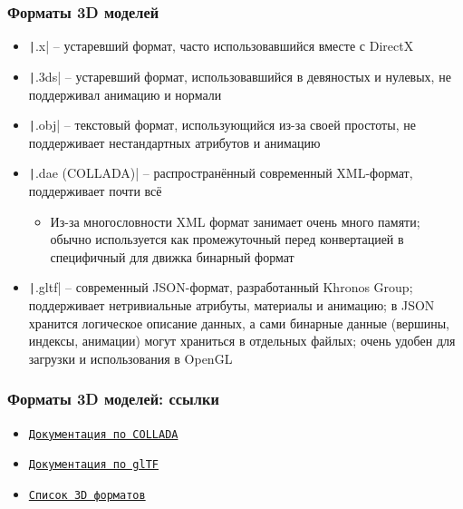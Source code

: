 \documentclass[10pt]{beamer}
\begin{document}
\begin{frame}[fragile]
\frametitle{Форматы 3D моделей}
\fontsize{8pt}{8pt}
\selectfont
\begin{itemize}
\item \texttt|.x| -- устаревший формат, часто использовавшийся вместе с DirectX
\pause
\item \texttt|.3ds| -- устаревший формат, использовавшийся в девяностых и нулевых, не поддерживал анимацию и нормали
\pause
\item \texttt|.obj| -- текстовый формат, использующийся из-за своей простоты, не поддерживает нестандартных атрибутов и анимацию
\pause
\item \texttt|.dae (COLLADA)| -- распространённый современный XML-формат, поддерживает почти всё
\pause
\begin{itemize}
\fontsize{8pt}{8pt}
\selectfont
\item Из-за многословности XML формат занимает очень много памяти; обычно используется как промежуточный перед конвертацией в специфичный для движка бинарный формат
\end{itemize}
\pause
\item \texttt|.gltf| -- современный JSON-формат, разработанный Khronos Group; поддерживает нетривиальные атрибуты, материалы и анимацию; в JSON хранится логическое описание данных, а сами бинарные данные (вершины, индексы, анимации) могут храниться в отдельных файлых; очень удобен для загрузки и использования в OpenGL
\end{itemize}
\end{frame}

\begin{frame}[fragile]
\frametitle{Форматы 3D моделей: ссылки}
\begin{itemize}
\item \href{https://www.khronos.org/collada}{\texttt{Документация по COLLADA}}
\item \href{https://registry.khronos.org/glTF/specs/2.0/glTF-2.0.html}{\texttt{Документация по glTF}}
\item \href{https://en.wikipedia.org/wiki/List_of_file_formats#3D_graphics}{\texttt{Список 3D форматов}}
\end{itemize}
\end{frame}
\end{document}
